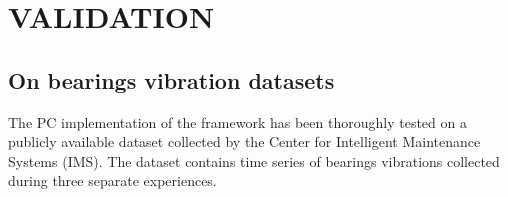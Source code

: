 \section{VALIDATION}
\label{sec:validation}

\subsection{On bearings vibration datasets}

The PC implementation of the framework has been thoroughly tested on a publicly available dataset collected by the Center for Intelligent Maintenance Systems (IMS).
The dataset contains time series of bearings vibrations collected during three separate  experiences. 

